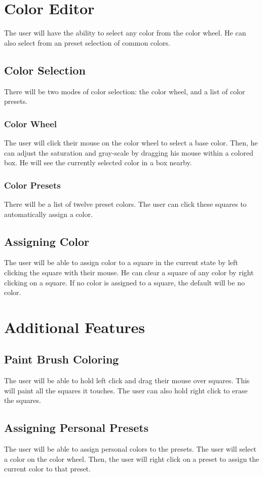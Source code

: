 \documentclass[12pt]{article}
\begin{document}
 
\section{Color Editor}
The user will have the ability to select any color from the color wheel. He can also select from an preset selection of common colors.
\subsection{Color Selection}
There will be two modes of color selection: the color wheel, and a list of color presets.
\subsubsection{Color Wheel}
The user will click their mouse on the color wheel to select a base color. Then, he can adjust the saturation and gray-scale by dragging his mouse within a colored box. He will see the currently selected color in a box nearby. 
\subsubsection{Color Presets} 
There will be a list of twelve preset colors. The user can click these squares to automatically assign a color.
\subsection{Assigning Color}
The user will be able to assign color to a square in the current state by left clicking the square with their mouse. He can clear a square of any color by right clicking on a square. If no color is assigned to a square, the default will be no color.
\section{Additional Features}
\subsection{Paint Brush Coloring}
The user will be able to hold left click and drag their mouse over squares. This will paint all the squares it touches. The user can also hold right click to erase the squares.
\subsection{Assigning Personal Presets}
The user will be able to assign personal colors to the presets. The user will select a color on the color wheel. Then, the user will right click on a preset to assign the current color to that preset.
\end{document}
